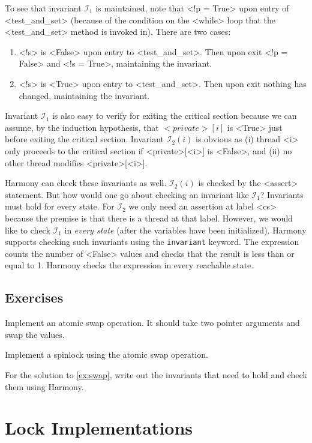 \documentclass{report}
\begin{document}
To see that invariant $\mathcal{I}_1$ is maintained, note that
<{!p = True}> upon entry of <{test_and_set}>
(because of the condition on the <{while}> loop that the
<{test_and_set}> method is invoked in).
There are two cases:
\begin{enumerate}
\item <{!s}> is <{False}> upon entry to <{test_and_set}>.
Then upon exit <{!p = False}> and <{!s = True}>,
maintaining the invariant.
\item <{!s}> is <{True}> upon entry to <{test_and_set}>.
Then upon exit nothing has changed, maintaining the invariant.
\end{enumerate}
Invariant $\mathcal{I}_1$ is also easy to verify for exiting the critical section
because we can assume, by the induction hypothesis, that $<{private}>[i]$ is
<{True}> just before exiting the critical section.
Invariant $\mathcal{I}_2(i)$ is obvious as (i) thread <{i}> only proceeds to the critical
section if <{private}>[<{i}>] is <{False}>, and (ii) no other thread modifies
<{private}>[<{i}>].

Harmony can check these invariants as well.
$\mathcal{I}_2(i)$ is checked by the <{assert}> statement.
But how would one go about checking an
invariant like $\mathcal{I}_1$?  Invariants must hold for every state.
For $\mathcal{I}_2$ we only need an assertion at label <{cs}> because the
premise is that there is a thread at that label.  However, we would
like to check $\mathcal{I}_1$ in \emph{every state} (after the variables have
been initialized).
Harmony supports checking such invariants using the \texttt{invariant}
keyword.
The expression counts the number of <{False}> values and checks that
the result is less than or equal to 1.
Harmony checks the expression in every reachable state.

\section*{Exercises}
\begin{problems}
\item Implement an atomic swap operation.  It should take two pointer arguments
and swap the values.
\item \label{ex:swap} Implement a spinlock using the atomic swap operation.
\item For the solution to \autoref{ex:swap},
write out the invariants that need to hold and check them using Harmony.
\end{problems}

\chapter{Lock Implementations}
\label{ch:synch}
%
%
\end{document}
